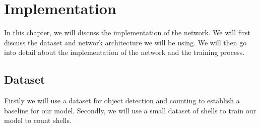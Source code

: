  
\chapter{Implementation}
In this chapter, we will discuss the implementation of the network. We will first discuss the dataset and network architecture we will be using. We will then go into detail about the implementation of the network and the training process. 

\section{Dataset}
Firstly we will use a dataset for object detection and counting to establish a baseline for our model. Secondly, we will use a small dataset of shells to train our model to count shells.